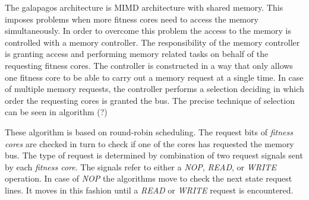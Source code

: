 The galapagos architecture is MIMD architecture with shared memory. This imposes problems when more fitness cores need to access the memory simultaneously. In order to overcome this problem the access to the memory is controlled with a memory controller. The responsibility of the memory controller is granting access and performing memory related tasks on behalf of the requesting fitness cores. The controller is constructed in a way that only allows one fitness core to be able to carry out a memory request at a single time. In case of multiple memory requests, the controller performs a selection deciding in which order the requesting cores is granted the bus. The precise technique of selection can be seen in algorithm (?)



These algorithm is based on round-robin scheduling. The request bits of \emph{fitness cores} are checked in turn to check if one of the cores has requested the memory bus. The type of request is determined by combination of two request signals sent by each \emph{fitness core}. The signals refer to either a \emph{NOP}, \emph{READ}, or \emph{WRITE} operation. In case of \emph{NOP} the algorithms move to check the next state request lines. It moves in this fashion until a \emph{READ} or \emph{WRITE} request is encountered. 





 








